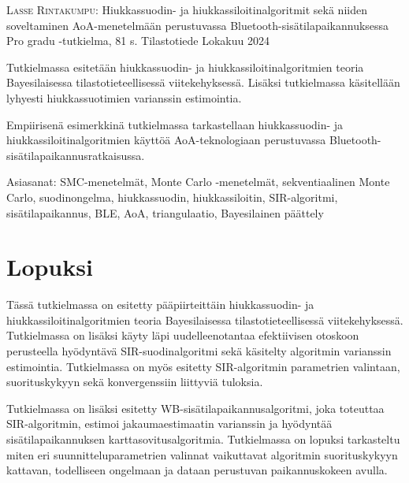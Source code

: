 \documentclass[
]{article}
\newcommand{\tekija}{{Lasse Rintakumpu}}
\newcommand{\otsikko}{{Hiukkassuodin- ja hiukkassiloitinalgoritmit sekä niiden soveltaminen AoA-menetelmään perustuvassa Bluetooth-sisätilapaikannuksessa}}
\newcommand{\tutkielma}{{Pro gradu }}
\newcommand{\aika}{{Lokakuu 2024}}
\newcommand{\paaaine}{{Tilastotiede}}
\begin{document}
\noindent \textsc{\tekija}: \otsikko \newline
\tutkielma-tutkielma, 81 s. \newline
\paaaine \newline
\aika
\par\noindent{\rule{\textwidth}{.2mm}} \newline


\vspace{4mm}\noindent Tutkielmassa esitetään hiukkassuodin- ja hiukkassiloitinalgoritmien teoria Bayesilaisessa tilastotieteellisessä viitekehyksessä. Lisäksi tutkielmassa käsitellään lyhyesti hiukkassuotimien varianssin estimointia.

\vspace{4mm}\noindent Empiirisenä esimerkkinä tutkielmassa tarkastellaan hiukkassuodin- ja hiukkassiloitinalgoritmien käyttöä AoA-teknologiaan perustuvassa Bluetooth-sisätilapaikannusratkaisussa.

\vspace{4mm}\noindent Asiasanat: SMC-menetelmät, Monte Carlo -menetelmät, sekventiaalinen Monte Carlo, suodinongelma, hiukkassuodin, hiukkassiloitin, SIR-algoritmi, sisätilapaikannus, BLE, AoA, triangulaatio, Bayesilainen päättely

\cleardoublepage

\cleardoublepage

\pagestyle{plain} 

{
\setcounter{tocdepth}{3}
\tableofcontents
}
\hypertarget{lopuksi}{%
\section{Lopuksi}\label{lopuksi}}

Tässä tutkielmassa on esitetty pääpiirteittäin hiukkassuodin- ja hiukkassiloitinalgoritmien teoria Bayesilaisessa tilastotieteellisessä viitekehyksessä. Tutkielmassa on lisäksi käyty läpi uudelleenotantaa efektiivisen otoskoon perusteella hyödyntävä SIR-suodinalgoritmi sekä käsitelty algoritmin varianssin estimointia. Tutkielmassa on myös esitetty SIR-algoritmin parametrien valintaan, suorituskykyyn sekä konvergenssiin liittyviä tuloksia.

Tutkielmassa on lisäksi esitetty WB-sisätilapaikannusalgoritmi, joka toteuttaa SIR-algoritmin, estimoi jakaumaestimaatin varianssin ja hyödyntää sisätilapaikannuksen karttasovitusalgoritmia. Tutkielmassa on lopuksi tarkasteltu miten eri suunnitteluparametrien valinnat vaikuttavat algoritmin suorituskykyyn kattavan, todelliseen ongelmaan ja dataan perustuvan paikannuskokeen avulla.
\end{document}
